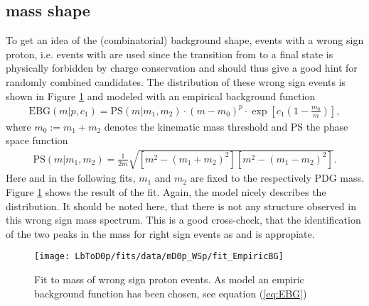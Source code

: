 \subsection{\Dz\proton mass shape}
\label{sec:Shape_mD0p}
To get an idea of the (combinatorial) background shape, events with a wrong sign proton, i.e. events with \Dz\antiproton\mun are used since the transition from \Lb to a \Dz\antiproton\mun final state is physically forbidden by charge conservation and should thus give a good hint for randomly combined \LbToDpmunu candidates. 
The \MDp distribution of these wrong sign events is shown in Figure \ref{fig:fit_mD0p_WS} and modeled with an empirical background function
\begin{align}
    \text{EBG}(m|p,c_1) = \text{PS}(m|m_1,m_2) \cdot (m - m_0)^p \cdot \exp\left[ c_1 \left(1-\frac{m_0}{m}\right)\right], \label{eq:EBG}
\end{align}
where $m_0 := m_1 + m_2$ denotes the kinematic \Dz\proton mass threshold and PS the phase space function
\begin{align}
    \text{PS}(m|m_1,m_2) = \frac{1}{2m} \sqrt{\left[m^2 - (m_1 + m_2)^2\right] \left[m^2 - (m_1 - m_2)^2\right]}. \label{eq:PS}
\end{align}
Here and in the following fits, $m_1$ and $m_2$ are fixed to the \Dz respectively \proton PDG mass.
Figure \ref{fig:fit_mD0p_WS} shows the result of the fit.
Again, the model nicely describes the distribution.
It should be noted here, that there is not any structure observed in this wrong sign mass spectrum.
This is a good cross-check, that the identification of the two peaks in the \Dz\proton mass for right sign events as \LcResI and \LcResII is appropiate.
\begin{figure}[hptb]
    \centering
	\texttt{[image: LbToD0p/fits/data/mD0p\_WSp/fit\_EmpiricBG]}
	\caption{Fit to \Dz\proton mass of wrong sign proton events.
             As model an empiric background function has been chosen, see equation (\ref{eq:EBG})}
    \label{fig:fit_mD0p_WS}
\end{figure}

